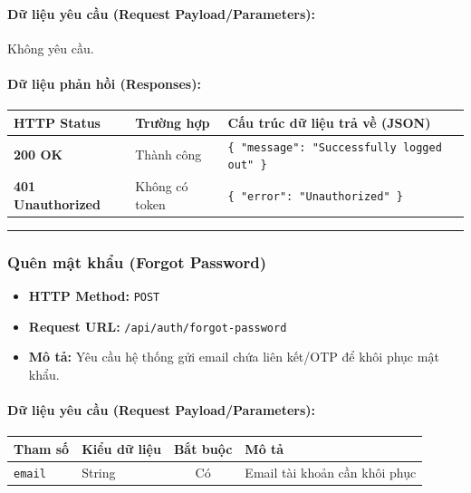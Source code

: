 \documentclass[12pt,a4paper]{article}
\begin{document}
\paragraph{Dữ liệu yêu cầu (Request Payload/Parameters):}
Không yêu cầu.\\

\paragraph{Dữ liệu phản hồi (Responses):}
\begin{longtable}{|>{\raggedright\arraybackslash}p{2.8cm}|>{\raggedright\arraybackslash}p{3.2cm}|>{\raggedright\arraybackslash}p{8.0cm}|}
\hline
\textbf{HTTP Status} & \textbf{Trường hợp} & \textbf{Cấu trúc dữ liệu trả về (JSON)} \\ \hline
\endhead
\textbf{200 OK} & Thành công & \texttt{\{ "message": "Successfully logged out" \}} \\ \hline
\textbf{401 Unauthorized} & Không có token & \texttt{\{ "error": "Unauthorized" \}} \\ \hline
\end{longtable}

\vskip 0.4cm
\noindent\rule{\textwidth}{0.3pt}
\vskip 0.4cm

\subsubsection{Quên mật khẩu (Forgot Password)}
\begin{itemize}[leftmargin=*]
    \item \textbf{HTTP Method:} \texttt{POST}
    \item \textbf{Request URL:} \texttt{/api/auth/forgot-password}
    \item \textbf{Mô tả:} Yêu cầu hệ thống gửi email chứa liên kết/OTP để khôi phục mật khẩu.
\end{itemize}

\paragraph{Dữ liệu yêu cầu (Request Payload/Parameters):}
\begin{longtable}{|>{\raggedright\arraybackslash}p{2.8cm}|>{\raggedright\arraybackslash}p{2.2cm}|c|>{\raggedright\arraybackslash}p{7.0cm}|}
\hline
\textbf{Tham số} & \textbf{Kiểu dữ liệu} & \textbf{Bắt buộc} & \textbf{Mô tả} \\ \hline
\endhead
\texttt{email} & String & Có & Email tài khoản cần khôi phục \\ \hline
\end{longtable}
\end{document}
